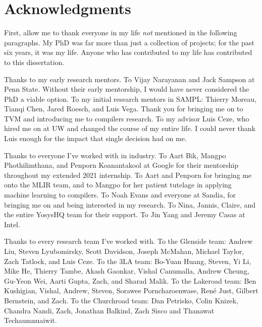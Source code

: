 \chapter*{Acknowledgments}





First, allow me to thank
  everyone in my life 
  \textit{not} mentioned in the following paragraphs.
My PhD was far more than just a collection
  of projects;
  for the past six years,
  it was my life.
Anyone who has contributed to my life
  has contributed to
  this dissertation.


Thanks to my early research mentors.
To Vijay Narayanan and Jack Sampson at Penn State.
Without their early mentorship,
  I would have never considered
  the PhD a viable option.
To my initial research mentors in SAMPL:
  Thierry Moreau, Tianqi Chen, Jared Roesch, and Luis Vega.
Thank you for bringing me on
  to TVM
  and introducing me to compilers research.
To my advisor Luis Ceze,
  who hired me on at UW
  and changed
  the course of my entire life.
I could never thank Luis enough
  for the impact that single decision
  had on me.

  
Thanks to everyone I've worked with in industry.
To Aart Bik, Mangpo Phothilimthana,
  and Penporn Koanantakool
  at Google
  for their mentorship throughout my 
  extended 2021 internship.
To Aart and Penporn
  for bringing me onto the MLIR team,
  and to Mangpo for her patient tutelage
  in applying machine learning to compilers.
To Noah Evans and everyone at Sandia,
  for bringing me on
  and being interested in my research.
To Nina, Jannis, Claire, and the entire YosysHQ team
  for their support.
To Jin Yang and Jeremy Casas at Intel.

Thanks to every research team
  I've worked with.
To the Glenside team: Andrew Liu, Steven Lyubomirsky, Scott Davidson, Joseph McMahan, Michael Taylor, Zach Tatlock, and Luis Ceze.
To the 3LA team: Bo-Yuan Huang, Steven, Yi Li, Mike He, Thierry Tambe, Akash Gaonkar, Vishal Canumalla, Andrew Cheung, Gu-Yeon Wei, Aarti Gupta, Zach, and Sharad Malik.
To the Lakeroad team: Ben Kushigian, Vishal, Andrew, Steven, Sorawee Porncharoenwase, Ren\'e Just, Gilbert Bernstein, and Zach.
To the Churchroad team:
  Dan Petrisko,
  Colin Knizek,
  Chandra Nandi, Zach,
  Jonathan Balkind, Zach Sisco and Thanawat Techaumnuaiwit.


